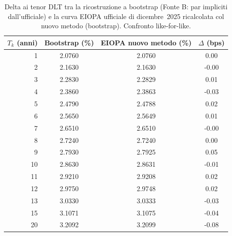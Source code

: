 \begin{table}[H]\centering\small
\caption{Delta ai tenor DLT tra la ricostruzione a bootstrap (Fonte B: par impliciti dall'ufficiale) e la curva EIOPA ufficiale di dicembre~2025 ricalcolata col nuovo metodo (bootstrap). Confronto like-for-like.}
\label{tab:delta-new-impl}\renewcommand{\arraystretch}{1.15}
\begin{tabular}{rccc}
\toprule
$T_k$ (anni) & Bootstrap (\%) & EIOPA nuovo metodo (\%) & $\Delta$ (bps)\\
\midrule
\rowcolor{rowtint}1 & 2.0760 & 2.0760 & 0.00\\
2 & 2.1630 & 2.1630 & -0.00\\
\rowcolor{rowtint}3 & 2.2830 & 2.2829 & 0.01\\
4 & 2.3860 & 2.3863 & -0.03\\
\rowcolor{rowtint}5 & 2.4790 & 2.4788 & 0.02\\
6 & 2.5650 & 2.5649 & 0.01\\
\rowcolor{rowtint}7 & 2.6510 & 2.6510 & -0.00\\
8 & 2.7240 & 2.7240 & 0.00\\
\rowcolor{rowtint}9 & 2.7930 & 2.7925 & 0.05\\
10 & 2.8630 & 2.8631 & -0.01\\
\rowcolor{rowtint}11 & 2.9210 & 2.9208 & 0.02\\
12 & 2.9750 & 2.9748 & 0.02\\
\rowcolor{rowtint}13 & 3.0330 & 3.0333 & -0.03\\
15 & 3.1071 & 3.1075 & -0.04\\
\rowcolor{rowtint}20 & 3.2092 & 3.2099 & -0.08\\
\bottomrule
\end{tabular}
\end{table}
